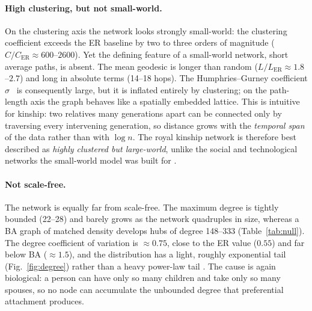 \paragraph{High clustering, but not small-world.}
On the clustering axis the network looks strongly small-world: the clustering
coefficient exceeds the ER baseline by two to three orders of magnitude
($C/C_{\mathrm{ER}}\approx 600$--$2600$). Yet the defining feature of a
small-world network, short average paths, is absent. The mean geodesic is
longer than random ($L/L_{\mathrm{ER}}\approx 1.8$--$2.7$) and long in
absolute terms (14--18 hops). The Humphries--Gurney coefficient $\sigma$~\cite{humphries2008network} is
consequently large, but it is inflated entirely by clustering; on the path-length
axis the graph behaves like a spatially embedded lattice. This is intuitive for
kinship: two relatives many generations apart can be connected only by traversing
every intervening generation, so distance grows with the \emph{temporal span} of
the data rather than with $\log n$. The royal kinship network is therefore best
described as \emph{highly clustered but large-world}, unlike the social and
technological networks the small-world model was built for
\cite{watts1998collective}.

\paragraph{Not scale-free.}
The network is equally far from scale-free. The maximum degree is tightly bounded
(22--28) and barely grows as the network quadruples in size, whereas a BA graph of
matched density develops hubs of degree 148--333 (Table~\ref{tab:null}). The
degree coefficient of variation is $\approx 0.75$, close to the ER value ($0.55$)
and far below BA ($\approx 1.5$), and the distribution has a light, roughly
exponential tail (Fig.~\ref{fig:degree}) rather than a heavy power-law tail
\cite{barabasi1999emergence,clauset2009powerlaw}. The cause is again biological: a
person can have only so many children and take only so many spouses, so no node
can accumulate the unbounded degree that preferential attachment produces.

